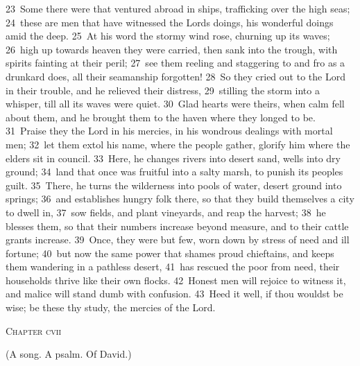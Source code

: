 \documentclass[10pt]{book} %
\begin{document}
\textcolor{benred8}{23}~Some there were that ventured abroad in ships, trafficking over the high seas; \textcolor{benred8}{24}~these are men that have witnessed the Lord\textquotesingle s doings, his wonderful doings amid the deep. \textcolor{benred8}{25}~At his word the stormy wind rose, churning up its waves; \textcolor{benred8}{26}~high up towards heaven they were carried, then sank into the trough, with spirits fainting at their peril; \textcolor{benred8}{27}~see them reeling and staggering to and fro as a drunkard does, all their seamanship forgotten! \textcolor{benred8}{28}~So they cried out to the Lord in their trouble, and he relieved their distress, \textcolor{benred8}{29}~stilling the storm into a whisper, till all its waves were quiet. \textcolor{benred8}{30}~Glad hearts were theirs, when calm fell about them, and he brought them to the haven where they longed to be. \textcolor{benred8}{31}~Praise they the Lord in his mercies, in his wondrous dealings with mortal men; \textcolor{benred8}{32}~let them extol his name, where the people gather, glorify him where the elders sit in council.
\textcolor{benred8}{33}~Here, he changes rivers into desert sand, wells into dry ground; \textcolor{benred8}{34}~land that once was fruitful into a salty marsh, to punish its people\textquotesingle s guilt. \textcolor{benred8}{35}~There, he turns the wilderness into pools of water, desert ground into springs; \textcolor{benred8}{36}~and establishes hungry folk there, so that they build themselves a city to dwell in, \textcolor{benred8}{37}~sow fields, and plant vineyards, and reap the harvest; \textcolor{benred8}{38}~he blesses them, so that their numbers increase beyond measure, and to their cattle grants increase. \textcolor{benred8}{39}~Once, they were but few, worn down by stress of need and ill fortune; \textcolor{benred8}{40}~but now the same power that shames proud chieftains, and keeps them wandering in a pathless desert, \textcolor{benred8}{41}~has rescued the poor from need, their households thrive like their own flocks. \textcolor{benred8}{42}~Honest men will rejoice to witness it, and malice will stand dumb with confusion. \textcolor{benred8}{43}~Heed it well, if thou wouldst be wise; be these thy study, the mercies of the Lord.
\begin{large}\begin{center}\textsc{Chapter cvii}\end{center}\end{large}
(A song. A psalm. Of David.)
\end{document}
